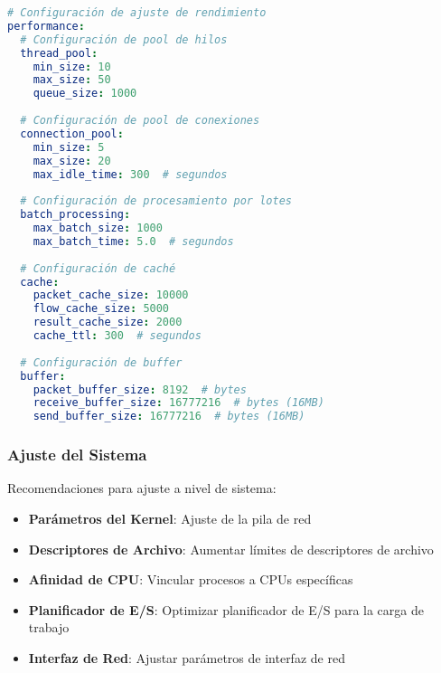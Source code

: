 \begin{lstlisting}[language=yaml, caption=Configuración de Ajuste de Rendimiento]
# Configuración de ajuste de rendimiento
performance:
  # Configuración de pool de hilos
  thread_pool:
    min_size: 10
    max_size: 50
    queue_size: 1000
    
  # Configuración de pool de conexiones
  connection_pool:
    min_size: 5
    max_size: 20
    max_idle_time: 300  # segundos
    
  # Configuración de procesamiento por lotes
  batch_processing:
    max_batch_size: 1000
    max_batch_time: 5.0  # segundos
    
  # Configuración de caché
  cache:
    packet_cache_size: 10000
    flow_cache_size: 5000
    result_cache_size: 2000
    cache_ttl: 300  # segundos
    
  # Configuración de buffer
  buffer:
    packet_buffer_size: 8192  # bytes
    receive_buffer_size: 16777216  # bytes (16MB)
    send_buffer_size: 16777216  # bytes (16MB)
\end{lstlisting}

\subsubsection{Ajuste del Sistema}
Recomendaciones para ajuste a nivel de sistema:

\begin{itemize}
    \item \textbf{Parámetros del Kernel}: Ajuste de la pila de red
    \item \textbf{Descriptores de Archivo}: Aumentar límites de descriptores de archivo
    \item \textbf{Afinidad de CPU}: Vincular procesos a CPUs específicas
    \item \textbf{Planificador de E/S}: Optimizar planificador de E/S para la carga de trabajo
    \item \textbf{Interfaz de Red}: Ajustar parámetros de interfaz de red
\end{itemize}

